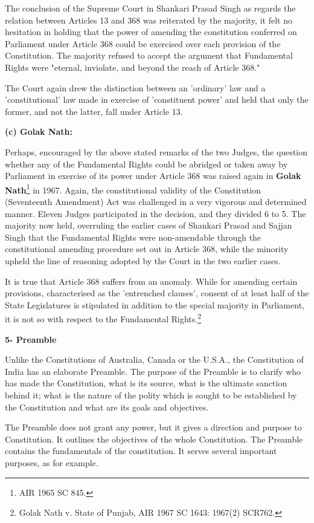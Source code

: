 \begin{multicols}{2}
\noi
The conclusion of the Supreme Court in Shankari Prasad Singh as regards the relation between
Articles 13 and 368 was reiterated by the majority, it felt no hesitation in holding that the power
of amending the constitution conferred on Parliament under Article 368 could be exercised over
each provision of the Constitution. The majority refused to accept the argument that Fundamental
Rights were "eternal, inviolate, and beyond the reach of Article 368."

\noi
The Court again drew the distinction between an 'ordinary' law and a 'constitutional' law made in
exercise of 'constituent power' and held that only the former, and not the latter, fall under Article 13.

\noi
{\large \bfseries (c) Golak Nath:}

\noi
Perhaps, encouraged by the above stated remarks of the two Judges, the question whether any of
the Fundamental Rights could be abridged or taken away by Parliament in exercise of its power
under Article 368 was raised again in \textbf{Golak Nath}\footnote{AIR 1965 SC 845.} in 1967. Again, the constitutional validity of
the Constitution (Seventeenth Amendment) Act was challenged in a very vigorous and
determined manner. Eleven Judges participated in the decision, and they divided 6 to 5. The
majority now held, overruling the earlier cases of Shankari Prasad and Sajjan Singh that the
Fundamental Rights were non-amendable through the constitutional amending procedure set out
in Article 368, while the minority upheld the line of reasoning adopted by the Court in the two
earlier cases.

\noi
It is true that Article 368 suffers from an anomaly. While for amending certain provisions,
characterised as the 'entrenched clauses', consent of at least half of the State Legislatures is
stipulated in addition to the special majority in Parliament, it is not so with respect to the
Fundamental Rights.\footnote{Golak Nath v. State of Punjab, AIR 1967 SC 1643: 1967(2) SCR762.}

\noi
{\large \bfseries 5- Preamble}

\noi
Unlike the Constitutions of Australia, Canada or the U.S.A., the Constitution of India has an
elaborate Preamble. The purpose of the Preamble is to clarify who has made the Constitution,
what is its source, what is the ultimate sanction behind it; what is the nature of the polity which
is sought to be established by the Constitution and what are its goals and objectives.

\noi
The Preamble does not grant any power, but it gives a direction and purpose to Constitution. It
outlines the objectives of the whole Constitution. The Preamble contains the fundamentals of the
constitution. It serves several important purposes, as for example.


\end{multicols}
